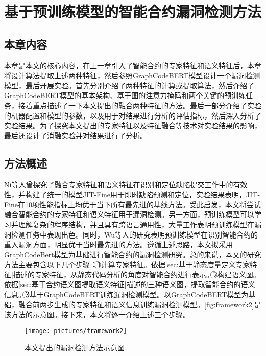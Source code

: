 \chapter{基于预训练模型的智能合约漏洞检测方法}
\section{本章内容}
\label{sec:本章内容4}
本章是本文的核心内容，在上一章引入了智能合约的专家特征和语义特征后，本章将设计算法提取上述两种特征，然后参照GraphCodeBERT模型设计一个漏洞检测模型，最后开展实验。首先分别介绍了两种特征的计算或提取算法，然后介绍了GraphCodeBERT模型的基本架构、基于图的注意力掩码和两个关键的预训练任务，接着重点描述了一下本文提出的融合两种特征的方法。最后一部分介绍了实验的机器配置和模型的参数，以及用于对结果进行分析的评估指标，然后深入分析了实验结果。为了探究本文提出的专家特征以及特征融合等技术对实验结果的影响，最后还设计了消融实验并对结果进行了分析。
\section{方法概述}
\label{sec:方法概述}
Ni等人\cite{bestofboth}曾探究了融合专家特征和语义特征在识别和定位缺陷提交工作中的有效性，并构建了统一的模型JIT-Fine用于即时缺陷预测和定位，实验结果表明，JIT-Fine在10项性能指标上均优于当下所有最先进的基线方法。受此启发，本文将尝试融合智能合约的专家特征和语义特征用于漏洞检测。另一方面，预训练模型可以学习并理解复杂的程序结构，并且具有跨语言通用性，大量工作表明预训练模型在漏洞检测任务中表现出色\cite{pretrained_is_good_1,pretrained_is_good_2,pretrained_is_good_3}。同时，Wu等人的研究表明预训练模型在识别智能合约的重入漏洞方面，明显优于当时最先进的方法\cite{wu2021peculiar}。遵循上述思路，本文拟采用GraphCodeBert模型为基础进行智能合约的漏洞检测研究。总的来说，本文的研究方法主要包含以下几个步骤：\textcircled{1}计算专家特征。依据\autoref{sec:基于静态度量定义专家特征}描述的专家特征，从静态代码分析的角度对智能合约进行表示。\textcircled{2}构建语义图。依据\autoref{sec:基于合约语义图提取语义特征}描述的三种语义图，提取智能合约的语义信息。\textcircled{3}基于GraphCodeBERT训练漏洞检测模型。以GraphCodeBERT模型为基础，融合前两步生成的专家特征和语义信息训练漏洞检测模型。\autoref{fig:framework2}是该方法的示意图。接下来，本文将逐一介绍上述三个步骤。
\begin{figure}[htbp]
    \centering
    \texttt{[image: pictures/framework2]}
    \caption{\label{fig:framework2}本文提出的漏洞检测方法示意图}
\end{figure}

